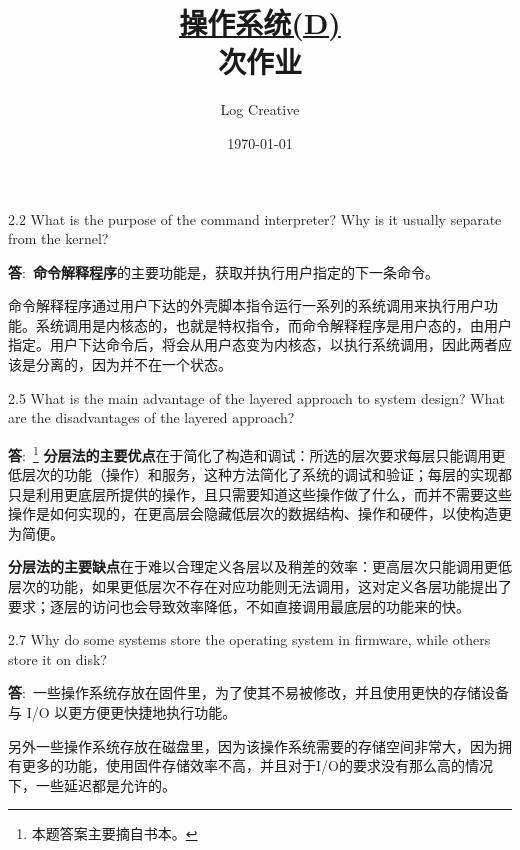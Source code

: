 \documentclass[12pt,a4paper]{article}
\newenvironment{problems}{\begin{list}{}{\renewcommand{\makelabel}[1]{\textbf{##1}\hfil}}}{\end{list}}
\providecommand{\ans}{\textbf{答}:~}
\begin{document}
\title{\normalsize \underline{操作系统(D)}\\ 次作业}
\author{Log Creative }
\date{\today}
\maketitle

\begin{problems}
    \item[2.2] What is the purpose of the command interpreter? Why is it usually
    separate from the kernel?

    \ans \textbf{命令解释程序}的主要功能是，获取并执行用户指定的下一条命令。
    
    命令解释程序通过用户下达的外壳脚本指令运行一系列的系统调用来执行用户功能。系统调用是内核态的，也就是特权指令，而命令解释程序是用户态的，由用户指定。用户下达命令后，将会从用户态变为内核态，以执行系统调用，因此两者应该是分离的，因为并不在一个状态。

    \item[2.5] What is the main advantage of the layered approach to system design?
    What are the disadvantages of the layered approach?

    \ans\footnote{本题答案主要摘自书本。} \textbf{分层法的主要优点}在于简化了构造和调试：所选的层次要求每层只能调用更低层次的功能（操作）和服务，这种方法简化了系统的调试和验证；每层的实现都只是利用更底层所提供的操作，且只需要知道这些操作做了什么，而并不需要这些操作是如何实现的，在更高层会隐藏低层次的数据结构、操作和硬件，以使构造更为简便。

    \textbf{分层法的主要缺点}在于难以合理定义各层以及稍差的效率：更高层次只能调用更低层次的功能，如果更低层次不存在对应功能则无法调用，这对定义各层功能提出了要求；逐层的访问也会导致效率降低，不如直接调用最底层的功能来的快。
    \item[2.7] Why do some systems store the operating system in firmware, while
    others store it on disk?

    \ans 一些操作系统存放在固件里，为了使其不易被修改，并且使用更快的存储设备与 I/O 以更方便更快捷地执行功能。
    
    另外一些操作系统存放在磁盘里，因为该操作系统需要的存储空间非常大，因为拥有更多的功能，使用固件存储效率不高，并且对于I/O的要求没有那么高的情况下，一些延迟都是允许的。
\end{problems}
\end{document}
